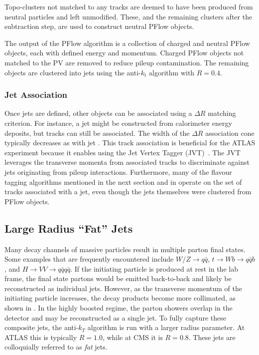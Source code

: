 Topo-clusters not matched to any tracks are deemed to have been produced from neutral particles and left unmodified.
These, and the remaining clusters after the subtraction step, are used to construct neutral PFlow objects.

The output of the PFlow algorithm is a collection of charged and neutral PFlow objects, each with defined energy and momentum.
Charged PFlow objects not matched to the PV are removed to reduce pileup contamination.
The remaining objects are clustered into jets using the anti-$k_t$ algorithm with $R=0.4$.

\subsubsection{Jet Association}

Once jets are defined, other objects can be associated using a $\Delta R$ matching criterion.
For instance, a jet might be constructed from calorimeter energy deposits, but tracks can still be associated.
The width of the $\Delta R$ association cone typically decreases as with jet \pt.
This track association is beneficial for the ATLAS experiment because it enables using the Jet Vertex Tagger (JVT)~\cite{JVT}.
The JVT leverages the transverse momenta from associated tracks to discriminate against jets originating from pileup interactions.
Furthermore, many of the flavour tagging algorithms mentioned in the next section and in  operate on the set of tracks associated with a jet, even though the jets themselves were clustered from PFlow objects.

\subsection{Large Radius ``Fat'' Jets}

Many decay channels of massive particles result in multiple parton final states.
Some examples that are frequently encountered include $W/Z \rightarrow q \bar{q}$, $t \rightarrow Wb \rightarrow q \bar{q} b$, and $H \rightarrow VV \rightarrow q \bar{q} q \bar{q}$.
If the initiating particle is produced at rest in the lab frame, the final state partons would be emitted back-to-back and likely be reconstructed as individual jets.
However, as the transverse momentum of the initiating particle increases, the decay products become more collimated, as shown in .
In the highly boosted regime, the parton showers overlap in the detector and may be reconstructed as a single jet.
To fully capture these composite jets, the anti-$k_T$ algorithm is run with a larger radius parameter.
At ATLAS this is typically $R=1.0$, while at CMS it is $R=0.8$.
These jets are colloquially referred to as \textit{fat} jets.

